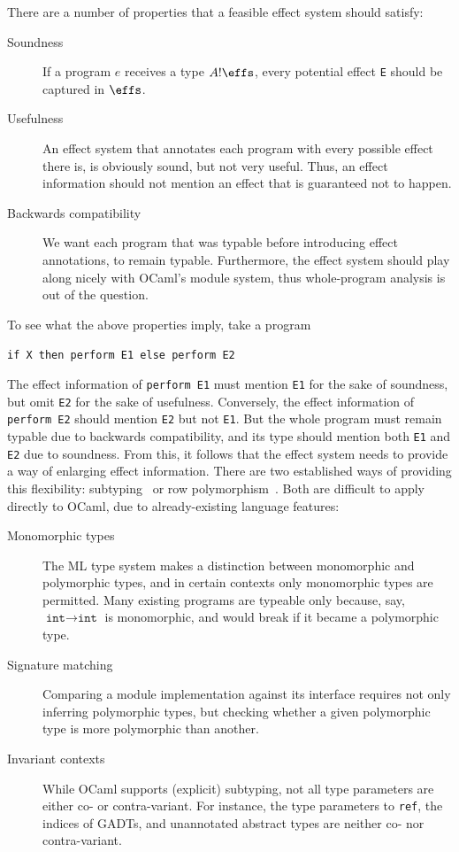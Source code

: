 \documentclass[a4paper,UKenglish]{dagrep}
\begin{document}
There are a number of properties that a feasible effect system should satisfy:
%
\begin{description}
\item[Soundness]
  If a program $e$ receives a type $A ! \effs$, every potential effect \verb|E| should be captured in $\effs$.
\item[Usefulness]
  An effect system that annotates each program with every possible effect there is,
  is obviously sound, but not very useful. Thus, an effect information should not
  mention an effect that is guaranteed not to happen.
\item[Backwards compatibility]
  We want each program that was typable before introducing effect annotations,
  to remain typable.
  Furthermore, the effect system should play along nicely with OCaml's module system,
  thus whole-program analysis is out of the question.
\end{description}
%
To see what the above properties imply, take a program

\verb|if X then perform E1 else perform E2|

\noindent The effect information of \verb|perform E1|
must mention \verb|E1| for the sake of soundness, but omit \verb|E2| for the sake of usefulness. Conversely, the effect information of \verb|perform E2|
should mention \verb|E2| but not \verb|E1|. But the whole program must remain typable due to backwards compatibility, and its type should mention both \verb|E1| and \verb|E2| due to soundness.
From this, it follows that the effect system needs to provide a way of enlarging effect information.
There are two established ways of providing this flexibility: subtyping~\cite{DBLP:conf/popl/WansbroughJ99} or row polymorphism~\cite{DBLP:journals/corr/Leijen14}. Both are difficult to apply directly to OCaml, due to already-existing language features:
%
\begin{description}
\item[Monomorphic types] The ML type system makes a distinction between monomorphic and polymorphic types, and in certain contexts only monomorphic types are permitted. Many existing programs are typeable only because, say, $\texttt{int} \to \texttt{int}$ is monomorphic, and would break if it became a polymorphic type.
\item[Signature matching] Comparing a module implementation against its interface requires not only inferring polymorphic types, but checking whether a given polymorphic type is more polymorphic than another.
\item[Invariant contexts] While OCaml supports (explicit) subtyping, not all type parameters are either co- or contra-variant. For instance, the type parameters to {\tt ref}, the indices of GADTs, and unannotated abstract types are neither co- nor contra-variant.
\end{description}
\end{document}
